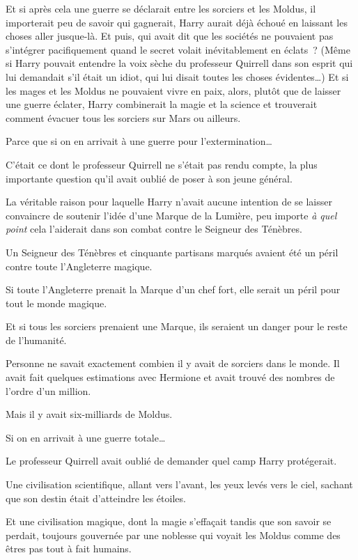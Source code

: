 Et si après cela une guerre se déclarait entre les sorciers et les Moldus, il importerait peu de savoir qui gagnerait, Harry aurait déjà échoué en laissant les choses aller jusque-là. Et puis, qui avait dit que les sociétés ne pouvaient pas s'intégrer pacifiquement quand le secret volait inévitablement en éclats~? (Même si Harry pouvait entendre la voix sèche du professeur Quirrell dans son esprit qui lui demandait s'il était un idiot, qui lui disait toutes les choses évidentes…) Et si les mages et les Moldus ne pouvaient vivre en paix, alors, plutôt que de laisser une guerre éclater, Harry combinerait la magie et la science et trouverait comment évacuer tous les sorciers sur Mars ou ailleurs.

Parce que si on en arrivait à une guerre pour l'extermination…

C'était ce dont le professeur Quirrell ne s'était pas rendu compte, la plus importante question qu'il avait oublié de poser à son jeune général.

La véritable raison pour laquelle Harry n'avait aucune intention de se laisser convaincre de soutenir l'idée d'une Marque de la Lumière, peu importe \emph{à quel point} cela l'aiderait dans son combat contre le Seigneur des Ténèbres.

Un Seigneur des Ténèbres et cinquante partisans marqués avaient été un péril contre toute l'Angleterre magique.

Si toute l'Angleterre prenait la Marque d'un chef fort, elle serait un péril pour tout le monde magique.

Et si tous les sorciers prenaient une Marque, ils seraient un danger pour le reste de l'humanité.

Personne ne savait exactement combien il y avait de sorciers dans le monde. Il avait fait quelques estimations avec Hermione et avait trouvé des nombres de l'ordre d'un million.

Mais il y avait six-milliards de Moldus.

Si on en arrivait à une guerre totale…

Le professeur Quirrell avait oublié de demander quel camp Harry protégerait.

Une civilisation scientifique, allant vers l'avant, les yeux levés vers le ciel, sachant que son destin était d'atteindre les étoiles.

Et une civilisation magique, dont la magie s'effaçait tandis que son savoir se perdait, toujours gouvernée par une noblesse qui voyait les Moldus comme des êtres pas tout à fait humains.


